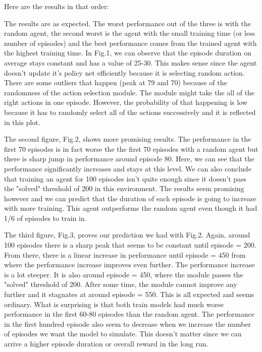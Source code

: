 \documentclass{article}
\numberwithin{equation}{section}
\numberwithin{equation}{section}
\begin{document}
Here are the results in that order:


The results are as expected. The worst performance out of the three is with the random agent, the second worst is the agent with the small training time (or less number of episodes) and the best performance comes from the trained agent with the highest training time. In Fig.1, we can observe that the episode duration on average stays constant and has a value of 25-30. This makes sense since the agent doesn't update it's policy net efficiently because it is selecting random action. There are some outliers that happen (peak at 79 and 70) because of the randomness of the action selection module. The module might take the all of the right actions in one episode. However, the probability of that happening is low because it has to randomly select all of the actions successively and it is reflected in this plot. 

The second figure, Fig.2, shows more promising results. The performance in the first 70 episodes is in fact worse the the first 70 episodes with a random agent but there is sharp jump in performance around episode 80. Here, we can see that the performance significantly increases and stays at this level. We can also conclude that training an agent for 100 episodes isn't quite enough since it doesn't pass the "solved" threshold of 200 in this environment. The results seem promising however and we can predict that the duration of each episode is going to increase with more training. This agent outperforms the random agent even though it had 1/6 of episodes to train in.

The third figure, Fig.3, proves our prediction we had with Fig.2. Again, around 100 episodes there is a sharp peak that seems to be constant until episode = 200. From there, there is a linear increase in performance until episode = 450 from where the performance increase improves even further. The performance increase is a lot steeper. It is also around episode = 450, where the module passes the "solved" threshold of 200. After some time, the module cannot improve any further and it stagnates at around episode = 550. This is all expected and seems ordinary. What is surprising is that both train models had much worse performance in the first 60-80 episodes than the random agent. The performance in the first hundred episode also seem to decrease when we increase the number of episodes we want the model to simulate. This doesn't matter since we can arrive a higher episode duration or overall reward in the long run.
\end{document}
